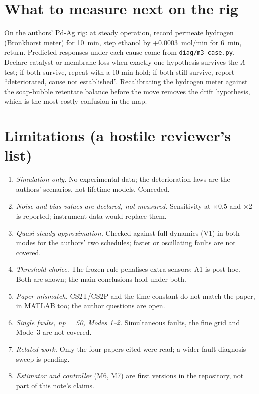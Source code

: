 \documentclass[10pt,a4paper]{article}
\begin{document}
\section{What to measure next on the rig}
On the authors' Pd-Ag rig: at steady operation, record permeate hydrogen (Bronkhorst meter) for 10~min, step ethanol by +0.0003~mol/min for 6~min, return. Predicted responses under each cause come from \texttt{diag/m3\_case.py}. Declare catalyst or membrane loss when exactly one hypothesis survives the $\Lambda$ test; if both survive, repeat with a 10-min hold; if both still survive, report ``deteriorated, cause not established''. Recalibrating the hydrogen meter against the soap-bubble retentate balance before the move removes the drift hypothesis, which is the most costly confusion in the map.

\section{Limitations (a hostile reviewer's list)}
\begin{enumerate}\itemsep0pt
\item \emph{Simulation only.} No experimental data; the deterioration laws are the authors' scenarios, not lifetime models. Conceded.
\item \emph{Noise and bias values are declared, not measured.} Sensitivity at $\times0.5$ and $\times2$ is reported; instrument data would replace them.
\item \emph{Quasi-steady approximation.} Checked against full dynamics (V1) in both modes for the authors' two schedules; faster or oscillating faults are not covered.
\item \emph{Threshold choice.} The frozen rule penalises extra sensors; A1 is post-hoc. Both are shown; the main conclusions hold under both.
\item \emph{Paper mismatch.} CS2T/CS2P and the time constant do not match the paper, in MATLAB too; the author questions are open.
\item \emph{Single faults, np = 50, Modes 1--2.} Simultaneous faults, the fine grid and Mode~3 are not covered.
\item \emph{Related work.} Only the four papers cited were read; a wider fault-diagnosis sweep is pending.
\item \emph{Estimator and controller} (M6, M7) are first versions in the repository, not part of this note's claims.
\end{enumerate}
\end{document}
